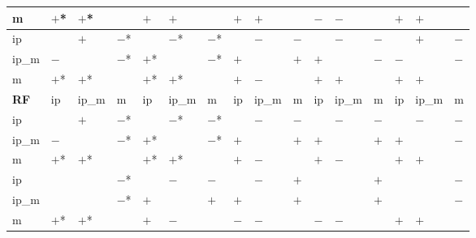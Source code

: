 \begin{table}[htbp]
{\begin{tabular}{l|lll|lll|lll|lll|lll}
m            & $+$*       & $+$*       &            & $+$        & $+$        &            & $+$        & $+$        &            & $-$        & $-$        &            & $+$        & $+$        &             \\
\hline
\hline
ip           &            & $+$        & $-$*       &            & $-$*       & $-$*       &            & $-$        & $-$        &            & $-$        & $-$        &            & $+$        & $-$         \\
ip\_m        & $-$        &            & $-$*       & $+$*       &            & $-$*       & $+$        &            & $+$        & $+$        &            & $-$        & $-$        &            & $-$         \\
m            & $+$*       & $+$*       &            & $+$*       & $+$*       &            & $+$        & $-$        &            & $+$        & $+$        &            & $+$        & $+$        &             \\
\hline
\textbf{RF}  & ip         & ip\_m      & m          & ip         & ip\_m      & m          & ip         & ip\_m      & m          & ip         & ip\_m      & m          & ip         & ip\_m      & m           \\
\hline
ip           &            & $+$        & $-$*       &            & $-$*       & $-$*       &            & $-$        & $-$        &            & $-$        & $-$        &            & $-$        & $-$         \\
ip\_m        & $-$        &            & $-$*       & $+$*       &            & $-$*       & $+$        &            & $+$        & $+$        &            & $+$        & $+$        &            & $-$         \\
m            & $+$*       & $+$*       &            & $+$*       & $+$*       &            & $+$        & $-$        &            & $+$        & $-$        &            & $+$        & $+$        &             \\
\hline
\hline
ip           &            &            & $-$*       &            & $-$        & $-$        &            & $-$        & $+$        &            &            & $+$        &            &            & $-$         \\
ip\_m        &            &            & $-$*       & $+$        &            & $+$        & $+$        &            & $+$        &            &            & $+$        &            &            & $-$         \\
m            & $+$*       & $+$*       &            & $+$        & $-$        &            & $-$        & $-$        &            & $-$        & $-$        &            & $+$        & $+$        &             \\

\end{tabular}}
\end{table}
